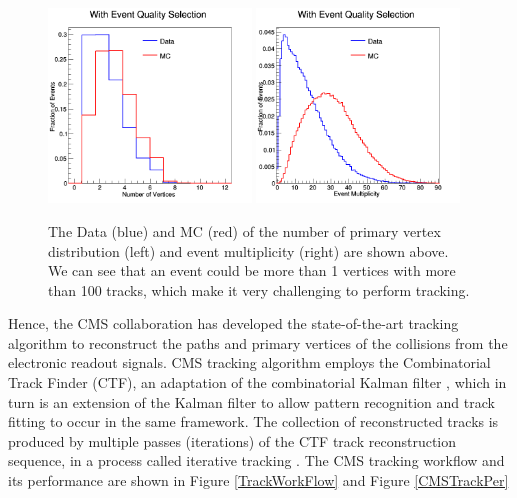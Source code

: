 \begin{figure}[hbtp]
\begin{center}
\includegraphics[width=0.48\textwidth]{Figures/Chapter3/Vertex.png}
\includegraphics[width=0.48\textwidth]{Figures/Chapter3/Multiplicity.png}
\caption{The Data (blue) and MC (red) of the number of primary vertex distribution (left) and event multiplicity (right) are shown above. We can see that an event could be more than 1 vertices with more than 100 tracks, which make it very challenging to perform tracking.}
\label{CMSEvtInfo}
\end{center}
\end{figure} 

Hence, the CMS collaboration has developed the state-of-the-art tracking algorithm to reconstruct the paths and primary vertices of the collisions from the electronic readout signals. CMS tracking algorithm employs the Combinatorial Track Finder (CTF), an adaptation of the combinatorial Kalman filter \cite{CMSTrack1,CMSTrack2,CMSTrack3}, which in turn is an extension of the Kalman filter \cite{Kalman} to allow pattern recognition and track fitting to occur in the same framework. The collection of reconstructed tracks is produced by multiple passes (iterations) of the CTF track reconstruction sequence, in a process called iterative tracking \cite{CMSTrackComp}. The CMS tracking workflow and its performance are shown in Figure \ref{TrackWorkFlow} and Figure \ref{CMSTrackPer}



